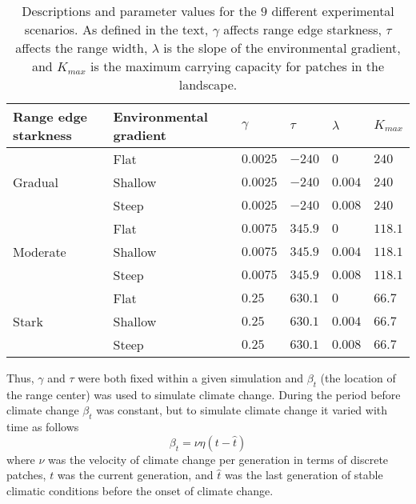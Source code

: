 \documentclass[11pt]{article}
\begin{document}
\begin{table}
\renewcommand{\arraystretch}{1.5}
  \begin{tabular}{ p{4cm} | p{4cm} | p{1.5cm} | p{1.5cm} | p{1.5cm}  | p{1.5cm} }
    \hline
    Range edge starkness & Environmental gradient & $\gamma$ & $\tau$ & $\lambda$ & $K_{max}$ \\ \hline \hline
     & Flat & $0.0025$ & $-240$ & $0$ & $240$ \\
    Gradual & Shallow & $0.0025$ & $-240$ & $0.004$ & $240$ \\
     & Steep & $0.0025$ & $-240$ & $0.008$ & $240$ \\ \hline
     & Flat & $0.0075$ & $345.9$ & $0$ & $118.1$ \\
    Moderate & Shallow & $0.0075$ & $345.9$ & $0.004$ & $118.1$ \\
     & Steep & $0.0075$ & $345.9$ & $0.008$ & $118.1$ \\ \hline
     & Flat & $0.25$ & $630.1$ & $0$ & $66.7$ \\
    Stark & Shallow & $0.25$ & $630.1$ & $0.004$ & $66.7$ \\
     & Steep & $0.25$ & $630.1$ & $0.008$ & $66.7$ \\ 
    \hline
  \end{tabular}
\caption[LoF entry]{Descriptions and parameter values for the $9$ different experimental scenarios. As defined in the text, $\gamma$ affects range edge starkness, $\tau$ affects the range width, $\lambda$ is the slope of the environmental gradient, and $K_{max}$ is the maximum carrying capacity for patches in the landscape.}
\label{table:Scenarios}
\end{table}

Thus, $\gamma$ and $\tau$ were both fixed within a given simulation and $\beta_{t}$ (the location of the range center) was used to simulate climate change. During the period before climate change $\beta_{t}$ was constant, but to simulate climate change it varied with time as follows
\begin{equation}
\beta_{t}=\nu\eta(t-\hat{t})
\end{equation}
where $\nu$ was the velocity of climate change per generation in terms of discrete patches, $t$ was the current generation, and $\hat{t}$ was the last generation of stable climatic conditions before the onset of climate change.
\end{document}
